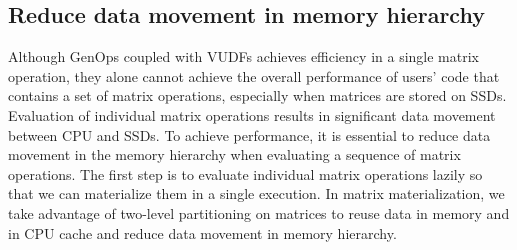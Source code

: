 

\subsection{Reduce data movement in memory hierarchy}
Although GenOps coupled with VUDFs achieves efficiency in a single matrix
operation, they alone cannot achieve the overall performance of users' code
that contains a set of matrix operations, especially when matrices are stored
on SSDs. Evaluation of individual matrix operations results in significant
data movement between CPU and SSDs. To achieve performance, it is essential
to reduce data movement in the memory hierarchy when evaluating a sequence
of matrix operations. The first step is to evaluate individual matrix operations
lazily so that we can materialize them in a single execution. In matrix
materialization, we take advantage of two-level partitioning on matrices to
reuse data in memory and in CPU cache and reduce data movement in memory
hierarchy.

